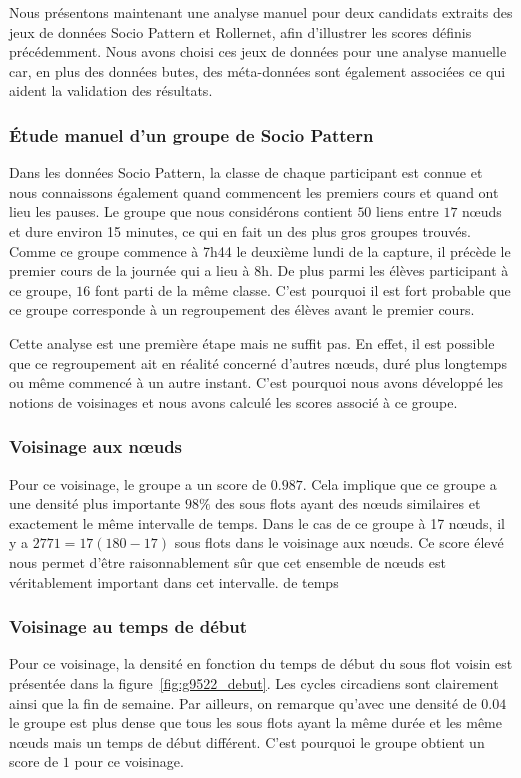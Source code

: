 
Nous présentons maintenant une analyse manuel pour deux candidats extraits des jeux de données Socio Pattern et Rollernet, afin d'illustrer les scores définis précédemment.
Nous avons choisi ces jeux de données pour une analyse manuelle car, en plus des données butes, des méta-données sont également associées ce qui aident la validation des résultats.

\subsubsection{\'Etude manuel d'un groupe de Socio Pattern}
Dans les données Socio Pattern, la classe de chaque participant est connue et nous connaissons également quand commencent les premiers cours et quand ont lieu les pauses.
Le groupe que nous considérons contient $50$ liens entre $17$ n\oe uds et dure environ 15 minutes, ce qui en fait un des plus gros groupes trouvés.
Comme ce groupe commence à 7h44 le deuxième lundi de la capture, il précède le premier cours de la journée qui a lieu à 8h.
De plus parmi les élèves participant à ce groupe, $16$ font parti de la même classe.
C'est pourquoi il est fort probable que ce groupe corresponde à un regroupement des élèves avant le premier cours.

Cette analyse est une première étape mais ne suffit pas.
En effet, il est possible que ce regroupement ait en réalité concerné d'autres n\oe uds, duré plus longtemps ou même commencé à un autre instant.
C'est pourquoi nous avons développé les notions de voisinages et nous avons calculé les scores associé à ce groupe.

\subsubsection*{Voisinage aux n\oe uds}
Pour ce voisinage, le groupe a un score de $0.987$.
Cela implique que ce groupe a une densité plus importante $98\%$ des sous flots ayant des n\oe uds similaires et exactement le même intervalle de temps.
Dans le cas de ce groupe à 17 n\oe uds, il y a $2771=17(180-17)$ sous flots dans le voisinage aux n\oe uds.
Ce score élevé nous permet d'être raisonnablement sûr que cet ensemble de n\oe uds est véritablement important dans cet intervalle. de temps

\subsubsection*{Voisinage au temps de début}
Pour ce voisinage, la densité en fonction du temps de début du sous flot voisin est présentée dans la figure~\ref{fig:g9522_debut}.
Les cycles circadiens sont clairement ainsi que la fin de semaine.
Par ailleurs, on remarque qu'avec une densité de $0.04$ le groupe est plus dense que tous les sous flots ayant la même durée et les même n\oe uds mais un temps de début différent.
C'est pourquoi le groupe obtient un score de $1$ pour ce voisinage.


